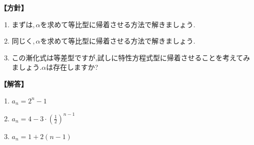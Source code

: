 \documentclass[dvipdfmx,a4paper,11pt,fleqn,openany]{jsbook}
\begin{document}
  \noindent\textbf{【方針】}
  \begin{enumerate}[label=(\arabic*),parsep=3pt]
    \item まずは,\,$\alpha$を求めて等比型に帰着させる方法で解きましょう.
    \item 同じく,\,$\alpha$を求めて等比型に帰着させる方法で解きましょう.
    \item この漸化式は等差型ですが,試しに特性方程式型に帰着させることを考えてみましょう.$\alpha$は存在しますか?
  \end{enumerate}

  \noindent\textbf{【解答】}
  \begin{enumerate}[label=(\arabic*),parsep=3pt]
    \item $\displaystyle a_n=2^n-1$
    \item $\displaystyle a_n=4-3\cdot\left(\frac{1}{2}\right)^{n-1}$
    \item $\displaystyle a_n=1+2(n-1)$
  \end{enumerate}
\end{document}
